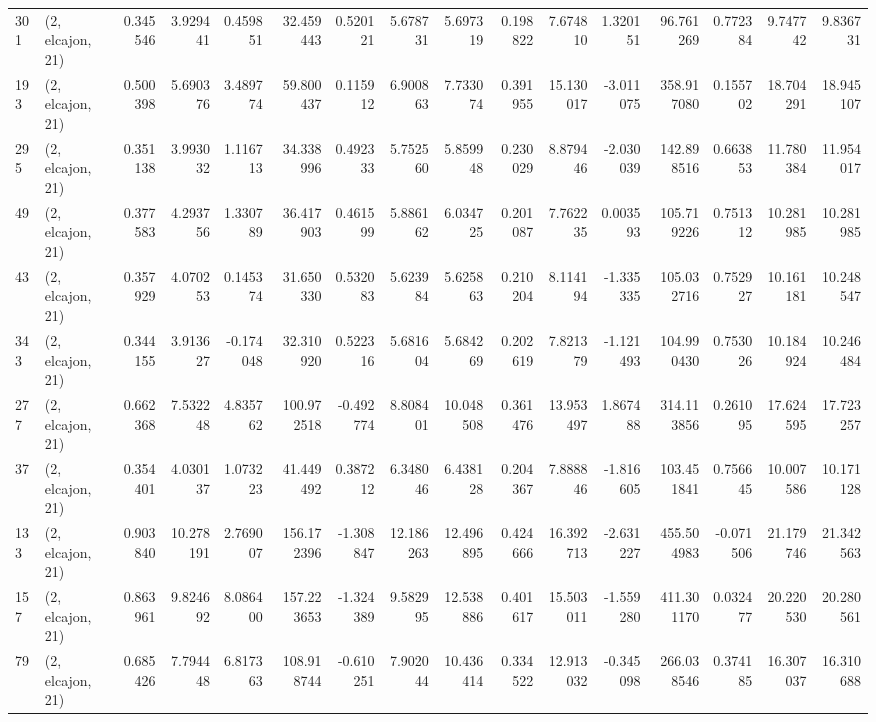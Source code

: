 \begin{tabular}{llrrrrrrrrrrrrrr}
301 &  (2, elcajon, 21) &   0.345546 &   3.929441 &   0.459851 &    32.459443 &   0.520121 &   5.678731 &   5.697319 &  0.198822 &   7.674810 &   1.320151 &    96.761269 &  0.772384 &   9.747742 &   9.836731 \\
193 &  (2, elcajon, 21) &   0.500398 &   5.690376 &   3.489774 &    59.800437 &   0.115912 &   6.900863 &   7.733074 &  0.391955 &  15.130017 &  -3.011075 &   358.917080 &  0.155702 &  18.704291 &  18.945107 \\
295 &  (2, elcajon, 21) &   0.351138 &   3.993032 &   1.116713 &    34.338996 &   0.492333 &   5.752560 &   5.859948 &  0.230029 &   8.879446 &  -2.030039 &   142.898516 &  0.663853 &  11.780384 &  11.954017 \\
49  &  (2, elcajon, 21) &   0.377583 &   4.293756 &   1.330789 &    36.417903 &   0.461599 &   5.886162 &   6.034725 &  0.201087 &   7.762235 &   0.003593 &   105.719226 &  0.751312 &  10.281985 &  10.281985 \\
43  &  (2, elcajon, 21) &   0.357929 &   4.070253 &   0.145374 &    31.650330 &   0.532083 &   5.623984 &   5.625863 &  0.210204 &   8.114194 &  -1.335335 &   105.032716 &  0.752927 &  10.161181 &  10.248547 \\
343 &  (2, elcajon, 21) &   0.344155 &   3.913627 &  -0.174048 &    32.310920 &   0.522316 &   5.681604 &   5.684269 &  0.202619 &   7.821379 &  -1.121493 &   104.990430 &  0.753026 &  10.184924 &  10.246484 \\
277 &  (2, elcajon, 21) &   0.662368 &   7.532248 &   4.835762 &   100.972518 &  -0.492774 &   8.808401 &  10.048508 &  0.361476 &  13.953497 &   1.867488 &   314.113856 &  0.261095 &  17.624595 &  17.723257 \\
37  &  (2, elcajon, 21) &   0.354401 &   4.030137 &   1.073223 &    41.449492 &   0.387212 &   6.348046 &   6.438128 &  0.204367 &   7.888846 &  -1.816605 &   103.451841 &  0.756645 &  10.007586 &  10.171128 \\
133 &  (2, elcajon, 21) &   0.903840 &  10.278191 &   2.769007 &   156.172396 &  -1.308847 &  12.186263 &  12.496895 &  0.424666 &  16.392713 &  -2.631227 &   455.504983 & -0.071506 &  21.179746 &  21.342563 \\
157 &  (2, elcajon, 21) &   0.863961 &   9.824692 &   8.086400 &   157.223653 &  -1.324389 &   9.582995 &  12.538886 &  0.401617 &  15.503011 &  -1.559280 &   411.301170 &  0.032477 &  20.220530 &  20.280561 \\
79  &  (2, elcajon, 21) &   0.685426 &   7.794448 &   6.817363 &   108.918744 &  -0.610251 &   7.902044 &  10.436414 &  0.334522 &  12.913032 &  -0.345098 &   266.038546 &  0.374185 &  16.307037 &  16.310688 \\

\end{tabular}
